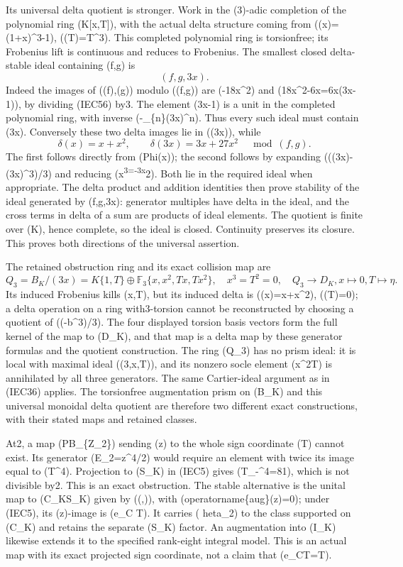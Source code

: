 \documentclass[
  10pt,
]{article}
\begin{document}
Its universal delta quotient is stronger. Work in the (3)-adic
completion of the polynomial ring (K{[}x,T{]}), with the actual delta
structure coming from (\Phi(x)=(1+x)\^{}3-1), (\Phi(T)=T\^{}3). This
completed polynomial ring is torsionfree; its Frobenius lift is
continuous and reduces to Frobenius. The smallest closed delta-stable
ideal containing (f,g) is \[
(f,g,3x).
\tag{IEC57}
\] Indeed the images of (\delta(f),\delta(g)) modulo ((f,g)) are
(-18x\^{}2) and (18x\^{}2-6x=6x(3x-1)), by dividing (IEC56) by3. The
element (3x-1) is a unit in the completed polynomial ring, with inverse
(-\sum\_\{n\}(3x)\^{}n). Thus every such ideal must contain (3x).
Conversely these two delta images lie in ((3x)), while \[
\delta(x)=x+x^2,\qquad
\delta(3x)=3x+27x^2\quad\bmod(f,g).
\tag{IEC58}
\] The first follows directly from (Phi(x)); the second follows by
expanding ((\Phi(3x)-(3x)\^{}3)/3) and reducing
(x\textsuperscript{3=-3x}2). Both lie in the required ideal when
appropriate. The delta product and addition identities then prove
stability of the ideal generated by (f,g,3x): generator multiples have
delta in the ideal, and the cross terms in delta of a sum are products
of ideal elements. The quotient is finite over (K), hence complete, so
the ideal is closed. Continuity preserves its closure. This proves both
directions of the universal assertion.

The retained obstruction ring and its exact collision map are \[
Q_3=B_K/(3x)
=K\{1,T\}\oplus\mathbb F_3\{x,x^2,Tx,Tx^2\},
\quad x^3=T^2=0,
\quad Q_3\longrightarrow D_K, x\mapsto0, T\mapsto\eta.
\tag{IEC59}
\] Its induced Frobenius kills (x,T), but its induced delta is
(\delta(x)=x+x\^{}2), (\delta(T)=0); a delta operation on a ring
with3-torsion cannot be reconstructed by choosing a quotient of
((\Phi-b\^{}3)/3). The four displayed torsion basis vectors form the
full kernel of the map to (D\_K), and that map is a delta map by these
generator formulas and the quotient construction. The ring (Q\_3) has no
prism ideal: it is local with maximal ideal ((3,x,T)), and its nonzero
socle element (x\^{}2T) is annihilated by all three generators. The same
Cartier-ideal argument as in (IEC36) applies. The torsionfree
augmentation prism on (B\_K) and this universal monoidal delta quotient
are therefore two different exact constructions, with their stated maps
and retained classes.

At2, a map (\widehat P\to B\_\{\mathbb Z\_2\}) sending (z) to the whole
sign coordinate (T) cannot exist. Its generator (E\_2=z\^{}4/2) would
require an element with twice its image equal to (T\^{}4). Projection to
(S\_K) in (IEC5) gives (T\_-\^{}4=81), which is not divisible by2. This
is an exact obstruction. The stable alternative is the unital map to
(C\_K\times S\_K) given by ((\rho,)), with
(operatorname\{aug\}(z)=0); under (IEC5), its (z)-image is (e\_C T). It
carries ( heta\_2) to the class supported on (C\_K) and retains the
separate (S\_K) factor. An augmentation into (I\_K) likewise extends it
to the specified rank-eight integral model. This is an actual map with
its exact projected sign coordinate, not a claim that (e\_CT=T).
\end{document}
